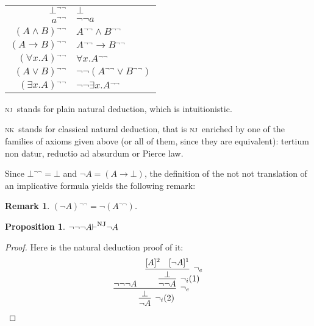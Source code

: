 \documentclass[english]{smfart}
\theoremstyle{plain}
\newtheorem{remark}[theorem]{Remark}
\newtheorem{proposition}[theorem]{Proposition}
\begin{document}
\begin{center} 
\begin{tabular}{r@{\,=\,}l}
$\bot{^{\lnot\lnot}}$ & $\bot$ \\
$a{^{\lnot\lnot}}$ & $\lnot\lnot a$ \\[2mm]

$(A \land B){^{\lnot\lnot}}$ & $A{^{\lnot\lnot}} \land B{^{\lnot\lnot}}$ \\ 
$(A \rightarrow B){^{\lnot\lnot}}$ & $A{^{\lnot\lnot}} \rightarrow B{^{\lnot\lnot}}$ \\
$(\forall x. A){^{\lnot\lnot}}$ & $\forall x. A{^{\lnot\lnot}}$ \\[2mm]

$(A \lor B){^{\lnot\lnot}}$ & $\lnot\lnot(A{^{\lnot\lnot}} \lor B{^{\lnot\lnot}})$ \\
$(\exists x. A){^{\lnot\lnot}}$ & $\lnot\lnot \exists x. A{^{\lnot\lnot}}$ \\
\end{tabular}
\end{center} 

{\mbox{\textsc{nj}}}\  stands for plain natural deduction, which is intuitionistic. 

{\mbox{\textsc{nk}}}\ stands for classical natural deduction, that is {\mbox{\textsc{nj}}}\ enriched by
one of the families of axioms given above (or all of them, since they are equivalent):  tertium non datur, reductio ad absurdum or Pierce law. 

Since $\bot{^{\lnot\lnot}}=\bot$ and $\lnot A=(A\rightarrow \bot)$, the definition of the not not translation of an implicative formula yields the following remark: 

\begin{remark} 
$(\lnot A){^{\lnot\lnot}}=\lnot(A{^{\lnot\lnot}})$. 
\end{remark} 

\begin{proposition}\label{nnnAyieldsnA} 
$\lnot\lnot\lnot A{\vdash}^{\mbox{\textsc{nj}}} \lnot A$
\end{proposition}

\begin{proof} Here is the natural deduction proof of it: 
$$ 
\infer[\lnot_i(2)]{\lnot A}{
   \infer[\lnot_e]{\bot}{
      \lnot\lnot\lnot A 
    & \infer[\lnot_i(1)]{\lnot\lnot A}{
          \infer[\lnot_e]{\bot}{
             [A]^2 
           & [\lnot A]^1
          }
       }
   }
}
$$
\end{proof} 
\end{document}
